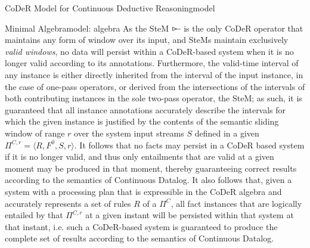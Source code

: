 \begin{nestedsection}{CoDeR Model for Continuous Deductive Reasoning}{model}
\begin{nestedsection}{Minimal Algebra}{model: algebra}
		As the SteM $\rstreamjoin$ is the only CoDeR operator that maintains any form of window over its input, and SteMs maintain exclusively \emph{valid windows}, no data will persist within a CoDeR-based system when it is no longer valid according to its annotations.
		Furthermore, the valid-time interval of any instance is either directly inherited from the interval of the input instance, in the case of one-pass operators, or derived from the intersections of the intervals of both contributing instances in the sole two-pass operator, the SteM;
		as such, it is guaranteed that all instance annotations accurately describe the intervals for which the given instance is justified by the contents of the semantic sliding window of range $r$ over the system input streams $S$ defined in a given ${\Pi^{C,r} = \langle R,F^0,S,r\rangle}$.
		It follows that no facts may persist in a CoDeR based system if it is no longer valid, and thus only entailments that are valid at a given moment may be produced in that moment, thereby guaranteeing correct results according to the semantics of Continuous Datalog.
		It also follows that, given a system with a processing plan that is expressible in the CoDeR algebra and accurately represents a set of rules $R$ of a $\Pi^C$, all fact instances that are logically entailed by that $\Pi^{C,r}$ at a given instant will be persisted within that system at that instant,
		i.e. such a CoDeR-based system is guaranteed to produce the complete set of results according to the semantics of Continuous Datalog.
	\end{nestedsection}
\end{nestedsection}
